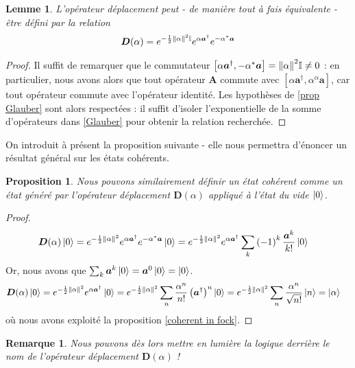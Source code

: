 \documentclass[11pt,oneside,a4paper]{article}
\newtheorem{lemma}[theorem]{Lemme}
\newtheorem{property}[theorem]{Proposition}
\newtheorem{remark}[theorem]{Remarque}
\begin{document}
\begin{lemma}
  \label{lemme displacement}
  L'opérateur déplacement peut - de manière tout à fais équivalente - être défini par la relation
  \begin{align}
    \bm{D}(\alpha) = e^{-\frac{1}{2}\norm{\alpha}^2\mathbb{I}}e^{\alpha\bm{a}^\dagger}e^{-\alpha^*\bm{a}}\label{eq:formulation equivalente operateur deplacement}
  \end{align}
\end{lemma}
\begin{proof}
  Il suffit de remarquer que le commutateur $\left[\alpha\bm{a}^\dagger,-\alpha^*\bm{a}\right] = \norm{\alpha}^2\mathbb{I} \neq 0$ : en particulier, nous avons alors que tout opérateur $\bm{A}$ commute avec $\left[\alpha\bm{a}^\dagger,\alpha^\alpha\bm{a}\right]$, car tout opérateur commute avec l'opérateur identité. Les hypothèses de \ref{prop Glauber} sont alors respectées : il suffit d'isoler l'exponentielle de la somme d'opérateurs dans \eqref{Glauber} pour obtenir la relation recherchée.
\end{proof}

On introduit à présent la proposition suivante - elle nous permettra d'énoncer un résultat général sur les états cohérents.

\begin{property}
  Nous pouvons similairement définir un état cohérent comme un état généré par l'opérateur déplacement $\bm{D}(\alpha)$ appliqué à l'état du vide $\ket{0}$.
\end{property}
\begin{proof}
  \begin{align*}
    \bm{D}(\alpha)\ket{0} &=  e^{-\frac{1}{2}\norm{\alpha}^2}e^{\alpha\bm{a}^\dagger}e^{-\alpha^*\bm{a}}\ket{0} = e^{-\frac{1}{2}\norm{\alpha}^2}e^{\alpha\bm{a}^\dagger} \sum_k \left(-1\right)^k \frac{\bm{a}^k}{k!}\ket{0}
  \end{align*}
  Or, nous avons que $\sum_k \bm{a}^k\ket{0} = \bm{a}^0\ket{0} = \ket{0}$.
  \begin{align*}
    \bm{D}(\alpha)\ket{0} &= e^{-\frac{1}{2}\norm{\alpha}^2}e^{\alpha\bm{a}^\dagger}\ket{0} =  e^{-\frac{1}{2}\norm{\alpha}^2} \sum_n \frac{\alpha^n}{n!}\left(\bm{a}^\dagger\right)^n\ket{0} = e^{-\frac{1}{2}\norm{\alpha}^2} \sum_n \frac{\alpha^n}{\sqrt{n!}}\ket{n} = \ket{\alpha}
  \end{align*}
  où nous avons exploité la proposition \eqref{coherent in fock}.
\end{proof}

\begin{remark}
  Nous pouvons dès lors mettre en lumière la logique derrière le nom de l'opérateur déplacement $\bm{D}(\alpha)$ !
\end{remark}
\end{document}

